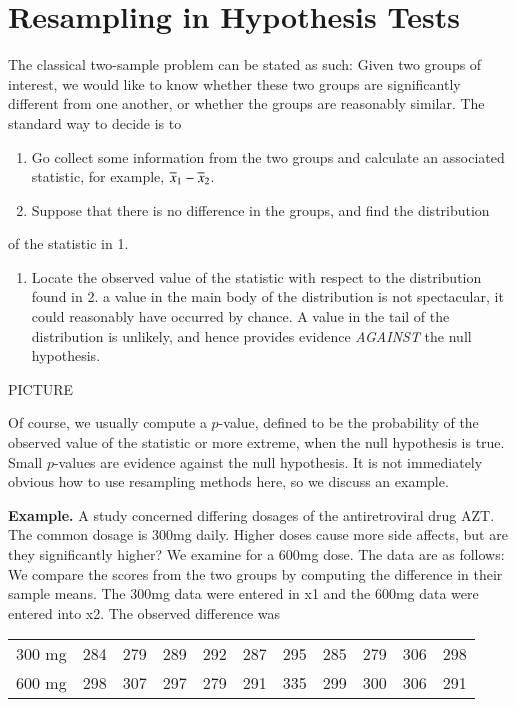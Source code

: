 \documentclass[captions=tableheading]{scrbook}
\begin{document}
\section{Resampling in Hypothesis Tests}
\label{sec-5_5}


The classical two-sample problem can be stated as such: Given two groups of interest, we would like to know whether these two groups are significantly different from one another, or whether the groups are reasonably similar. The standard way to decide is to


\begin{enumerate}
\item Go collect some information from the two groups and calculate an associated statistic, for example, $\overline{x}_{1}-\overline{x}_{2}$.
\item Suppose that there is no difference in the groups, and find the distribution
\end{enumerate}
of the statistic in 1. 


\begin{enumerate}
\item Locate the observed value of the statistic with respect to the distribution found in 2. a value in the main body of the distribution is not spectacular, it could reasonably have occurred by chance. A value in the tail of the distribution is unlikely, and hence provides evidence \emph{AGAINST} the null hypothesis.
\end{enumerate}
PICTURE

\vspace{1in}


Of course, we usually compute a $p$-value, defined to be the probability of the observed value of the statistic or more extreme, when the null hypothesis is true. Small $p$-values are evidence against the null hypothesis. It is not immediately obvious how to use resampling methods here, so we discuss an example.

\textbf{Example.} A study concerned differing dosages of the antiretroviral drug AZT. The common dosage is 300mg daily. Higher doses cause more side affects, but are they significantly higher? We examine for a 600mg dose. The data are as follows: We compare the scores from the two groups by computing the difference in their sample means. The 300mg data were entered in x1 and the 600mg data were entered into x2. The observed difference was

\begin{center}
\begin{tabular}{l|cccccccccc}
300 mg  & 284  & 279  & 289  & 292  & 287  & 295  & 285  & 279  & 306  & 298 \tabularnewline
600 mg  & 298  & 307  & 297  & 279  & 291  & 335  & 299  & 300  & 306  & 291 \tabularnewline
\end{tabular}
\par\end{center}
\end{document}
